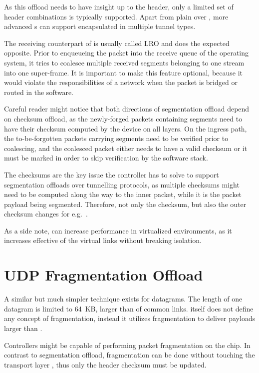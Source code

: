 As this offload needs to have insight up to the  header, only a limited
set of header combinations is typically supported. Apart from plain  over
, more advanced s can support  encapsulated in multiple
tunnel types.

The receiving counterpart of  is usually called \acrfull{LRO} and
does the expected opposite. Prior to enqueueing the packet into the receive
queue of the operating system, it tries to coalesce multiple received segments
belonging to one  stream into one super-frame. It is important to make
this feature optional, because it would violate the responsibilities of a network
when the packet is bridged or routed in the software.

Careful reader might notice that both directions of  segmentation offload depend on
checksum offload, as the newly-forged packets containing segments need to have their checksum
computed by the device on all layers. On the ingress path, the to-be-forgotten
packets carrying segments need to be verified prior to coalescing, and the
coalesced packet either needs to have a valid checksum or it must be marked in
order to skip verification by the software stack.

The checksums are the key issue the controller has to solve to support
segmentation offloads over tunnelling protocols, as multiple checksums might
need to be computed along the way to the inner  packet, while it is the
 packet payload being segmented. Therefore, not only the 
checksum, but also the outer  checksum changes for e.g.\ .

As a side note,  can increase performance in virtualized environments,
as it increases effective  of the virtual links without
breaking isolation.

\section{UDP Fragmentation Offload}

A similar but much simpler technique exists for  datagrams. The length of one
 datagram is limited to 64~KB, larger than  of common links.
 itself does not define any concept of fragmentation, instead it
utilizes  fragmentation to deliver payloads larger than .

Controllers might be capable of performing  packet fragmentation on the
chip. In contrast to  segmentation offload,  fragmentation
can be done without touching the transport layer , thus only the  header
checksum must be updated.

